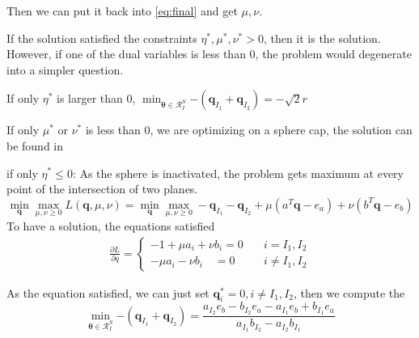 \documentclass[twoside]{article}
\theoremstyle{plain}
\newcommand{\tranT}{T}
\renewcommand{\vec}[1]{\bm{#1}}
\begin{document}
Then we can put it back into \ref{eq:final} and get $\mu, \nu$.

If the solution satisfied the constraints $\eta^{*}, \mu^{*}, \nu^{*} > 0$, then it is the solution.
However, if one of the dual variables is less than 0, the problem would degenerate into a simpler question. 

If only $\eta^{*}$ is larger than 0, 
 $\min_{\vec{\theta} \in \mathcal{R}^{S}_{I}}{- ( \vec{q}_{I_1} +\vec{q}_{I_2} )} = -\sqrt{2}r$

If only $\mu^{*}$ or $\nu^{*}$ is less than 0, we are optimizing on a sphere cap, the solution can be found in \cite[Appendix B]{NEURIPS2021_7b5b23f4}

if only $\eta^{*} \leq 0$:
As the sphere is inactivated, the problem gets maximum at every point of the intersection of two planes.
\begin{equation}
\min_{\vec{q}} \max_{\mu,\nu \geq 0} L(\vec{q},\mu,\nu) =\min_{\vec{q}}\max_{\mu,\nu\geq0} - {\vec{q}_{I_1} - \vec{q}_{I_2} +\mu( a^{\tranT}\vec{q} - e_a ) + \nu( b^{\tranT}\vec{q} - e_b )}
\end{equation}
To have a solution, the equations satisfied
 \begin{equation}
\begin{split} 
\frac{\partial L}{\partial q} = \left\{
\begin{aligned}
-1+\mu a_i + \nu b_i =0 \quad& i = I_1, I_2\\
-\mu a_i -\nu b_i \quad =0& i \neq I_1, I_2
\end{aligned}
\right.
 \end{split}
\end{equation}

As the equation satisfied, we can just set $\vec{q}_i^{*} = 0, i \neq I_1,I_2$, then we compute the  
 \begin{equation}
 \min_{\vec{\theta} \in \mathcal{R}^{S}_{I}}{- ( \vec{q}_{I_1} +\vec{q}_{I_2} )} = \frac{a_{I_2}e_b - b_{I_2}e_a -a_{I_1}e_b +b_{I_1}e_a}{a_{I_1}b_{I_2}-a_{I_2}b_{I_1}}
\end{equation}
\end{document}
